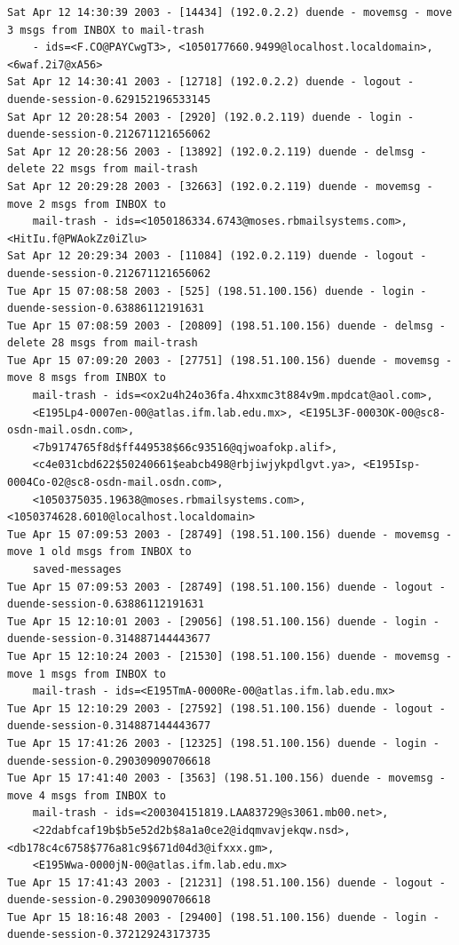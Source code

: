 \begin{lstlisting}[style=terminal]
Sat Apr 12 14:30:39 2003 - [14434] (192.0.2.2) duende - movemsg - move 3 msgs from INBOX to mail-trash 
    - ids=<F.CO@PAYCwgT3>, <1050177660.9499@localhost.localdomain>, <6waf.2i7@xA56>
Sat Apr 12 14:30:41 2003 - [12718] (192.0.2.2) duende - logout - duende-session-0.629152196533145
Sat Apr 12 20:28:54 2003 - [2920] (192.0.2.119) duende - login - duende-session-0.212671121656062
Sat Apr 12 20:28:56 2003 - [13892] (192.0.2.119) duende - delmsg - delete 22 msgs from mail-trash
Sat Apr 12 20:29:28 2003 - [32663] (192.0.2.119) duende - movemsg - move 2 msgs from INBOX to 
    mail-trash - ids=<1050186334.6743@moses.rbmailsystems.com>, <HitIu.f@PWAokZz0iZlu>
Sat Apr 12 20:29:34 2003 - [11084] (192.0.2.119) duende - logout - duende-session-0.212671121656062
Tue Apr 15 07:08:58 2003 - [525] (198.51.100.156) duende - login - duende-session-0.63886112191631
Tue Apr 15 07:08:59 2003 - [20809] (198.51.100.156) duende - delmsg - delete 28 msgs from mail-trash
Tue Apr 15 07:09:20 2003 - [27751] (198.51.100.156) duende - movemsg - move 8 msgs from INBOX to 
    mail-trash - ids=<ox2u4h24o36fa.4hxxmc3t884v9m.mpdcat@aol.com>, 
    <E195Lp4-0007en-00@atlas.ifm.lab.edu.mx>, <E195L3F-0003OK-00@sc8-osdn-mail.osdn.com>, 
    <7b9174765f8d$ff449538$66c93516@qjwoafokp.alif>, 
    <c4e031cbd622$50240661$eabcb498@rbjiwjykpdlgvt.ya>, <E195Isp-0004Co-02@sc8-osdn-mail.osdn.com>, 
    <1050375035.19638@moses.rbmailsystems.com>, <1050374628.6010@localhost.localdomain>
Tue Apr 15 07:09:53 2003 - [28749] (198.51.100.156) duende - movemsg - move 1 old msgs from INBOX to 
    saved-messages
Tue Apr 15 07:09:53 2003 - [28749] (198.51.100.156) duende - logout - duende-session-0.63886112191631
Tue Apr 15 12:10:01 2003 - [29056] (198.51.100.156) duende - login - duende-session-0.314887144443677
Tue Apr 15 12:10:24 2003 - [21530] (198.51.100.156) duende - movemsg - move 1 msgs from INBOX to 
    mail-trash - ids=<E195TmA-0000Re-00@atlas.ifm.lab.edu.mx>
Tue Apr 15 12:10:29 2003 - [27592] (198.51.100.156) duende - logout - duende-session-0.314887144443677
Tue Apr 15 17:41:26 2003 - [12325] (198.51.100.156) duende - login - duende-session-0.290309090706618
Tue Apr 15 17:41:40 2003 - [3563] (198.51.100.156) duende - movemsg - move 4 msgs from INBOX to 
    mail-trash - ids=<200304151819.LAA83729@s3061.mb00.net>, 
    <22dabfcaf19b$b5e52d2b$8a1a0ce2@idqmvavjekqw.nsd>, <db178c4c6758$776a81c9$671d04d3@ifxxx.gm>, 
    <E195Wwa-0000jN-00@atlas.ifm.lab.edu.mx>
Tue Apr 15 17:41:43 2003 - [21231] (198.51.100.156) duende - logout - duende-session-0.290309090706618
Tue Apr 15 18:16:48 2003 - [29400] (198.51.100.156) duende - login - duende-session-0.372129243173735

\end{lstlisting}
